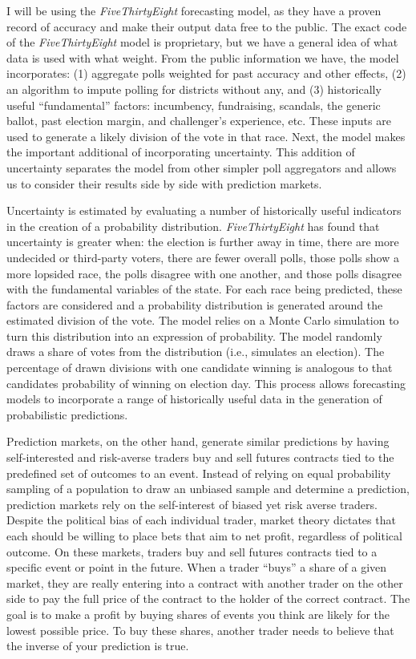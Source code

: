 \documentclass[11pt,]{article}
\begin{document}
I will be using the \emph{FiveThirtyEight} forecasting model, as they
have a proven record of accuracy and make their output data free to the
public. The exact code of the \emph{FiveThirtyEight} model is
proprietary, but we have a general idea of what data is used with what
weight. From the public information we have, the model incorporates: (1)
aggregate polls weighted for past accuracy and other effects, (2) an
algorithm to impute polling for districts without any, and (3)
historically useful ``fundamental'' factors: incumbency, fundraising,
scandals, the generic ballot, past election margin, and challenger's
experience, etc. These inputs are used to generate a likely division of
the vote in that race. Next, the model makes the important additional of
incorporating uncertainty. This addition of uncertainty separates the
model from other simpler poll aggregators and allows us to consider
their results side by side with prediction markets.

Uncertainty is estimated by evaluating a number of historically useful
indicators in the creation of a probability distribution.
\emph{FiveThirtyEight} has found that uncertainty is greater when: the
election is further away in time, there are more undecided or
third-party voters, there are fewer overall polls, those polls show a
more lopsided race, the polls disagree with one another, and those polls
disagree with the fundamental variables of the state. For each race
being predicted, these factors are considered and a probability
distribution is generated around the estimated division of the vote. The
model relies on a Monte Carlo simulation to turn this distribution into
an expression of probability. The model randomly draws a share of votes
from the distribution (i.e., simulates an election). The percentage of
drawn divisions with one candidate winning is analogous to that
candidates probability of winning on election day. This process allows
forecasting models to incorporate a range of historically useful data in
the generation of probabilistic predictions.

Prediction markets, on the other hand, generate similar predictions by
having self-interested and risk-averse traders buy and sell futures
contracts tied to the predefined set of outcomes to an event. Instead of
relying on equal probability sampling of a population to draw an
unbiased sample and determine a prediction, prediction markets rely on
the self-interest of biased yet risk averse traders. Despite the
political bias of each individual trader, market theory dictates that
each should be willing to place bets that aim to net profit, regardless
of political outcome. On these markets, traders buy and sell futures
contracts tied to a specific event or point in the future. When a trader
``buys'' a share of a given market, they are really entering into a
contract with another trader on the other side to pay the full price of
the contract to the holder of the correct contract. The goal is to make
a profit by buying shares of events you think are likely for the lowest
possible price. To buy these shares, another trader needs to believe
that the inverse of your prediction is true.
\end{document}
